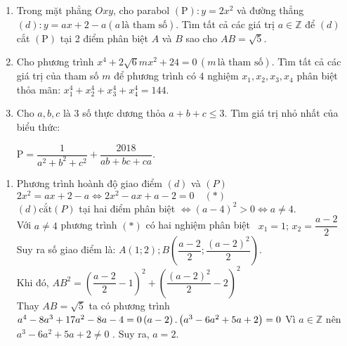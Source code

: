 \begin{ex}%
    \hfill
    
    \begin{enumerate}        
        \item Trong mặt phẳng $Oxy$, cho parabol $ \left( \mathrm{P} \right) : y = 2x^2$ và đường thẳng $ \left(d \right): y = ax + 2 - a \left(a \, \text{là tham số}\right)$. Tìm tất cả các giá trị $ a \in \mathbb{Z} $ để $ \left(d \right) $ cắt $ \left( \mathrm{P} \right) $ tại 2 điểm phân biệt $A$ và $B$ sao cho $ AB = \sqrt{5}. $
        \item Cho phương trình $ x^4+2 \sqrt{6}mx^2 + 24 = 0 \, \left( m \,\text{là tham số} \right) $. Tìm tất cả các giá trị của tham số $ m $ để phương trình có $4$ nghiệm $ x_1,x_2,x_3,x_4 $ phân biệt thỏa mãn: $ x_1^4+x_2^4+x_3^4+x_4^4 = 144. $ 
        \item Cho  $ a, b, c $ là $3$ số thực dương thỏa $ a + b + c \leqslant 3. $ Tìm giá trị nhỏ nhất của biểu thức: 
        \begin{center}
$         	\mathrm{P} = \dfrac{1}{a^2+b^2+c^2} + \dfrac{2018}{ab+bc+ca}. $
        \end{center}
    \end{enumerate}
\loigiai
    {
    \begin{enumerate}
        \item Phương trình hoành độ giao điểm $ \left(d\right) $ và $ \left(P\right) $ \\
        $ 2x^2 = ax + 2 - a \Leftrightarrow 2x^2 - ax + a - 2 = 0 \quad (*) $ \\
        $ \left(d\right) \text{cắt}  \left(P\right)$ tại hai điểm phân biệt $ \Leftrightarrow \left(a-4\right)^2 > 0 \Leftrightarrow a \neq 4. $ \\
        Với $ a \neq 4 $ phương trình $ \left(*\right) $ có hai nghiệm phân biệt \, $ x_1=1; \, x_2 = \dfrac{a-2}{2} $\\
        Suy ra số giao điểm là: $ A\left(1; 2\right); B \left(\dfrac{a-2}{2};\dfrac{\left(a-2\right) ^2}{2}\right). $\\
        Khi đó, $ AB^2 = \left(\dfrac{a-2}{2}-1\right)^2 +\left(\dfrac{\left(a-2\right)^2}{2}-2\right)^2 $ \\
        Thay $ AB = \sqrt{5} $ ta có phương trình $ a^4 - 8a^3 +17a^2-8a-4 = 0 \\
        \left(a-2\right).\left(a^3 - 6a^2 + 5a + 2\right) = 0 \\
        $ Vì $ a \in \mathbb{Z} $ nên $ a^3 - 6a^2 + 5a + 2 \neq 0 $ . Suy ra, $ a = 2 $.

\end{enumerate}}
\end{ex}
